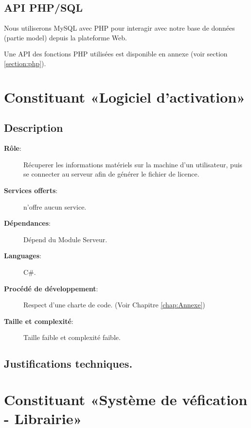 \subsection{API PHP/SQL}
Nous utiliserons MySQL avec PHP pour interagir avec notre base de données (partie model) depuis la plateforme Web.

Une API des fonctions PHP utilisées est disponible en annexe (voir section \ref{section:php}).


\section{Constituant «Logiciel d'activation»}
\subsection{Description}
\begin{description}
	\item[\textbf{Rôle}:]
		Récuperer les informations matériels sur la machine d'un utilisateur, puis 
		se connecter au serveur afin de générer le fichier de licence.
	\item[\textbf{Services offerts}:] 
		n'offre aucun service.
	\item[\textbf{Dépendances}:]
		Dépend du Module Serveur.
	\item[\textbf{Languages}:]
		C\#.
	\item[\textbf{Procédé de développement}:]
		Respect d'une charte de code. (Voir Chapitre \ref{chap:Annexe})
	\item[\textbf{Taille et complexité}:]
		Taille faible et complexité faible. 
\end{description}

\subsection{Justifications techniques.}

\section{Constituant «Système de véfication - Librairie»}
